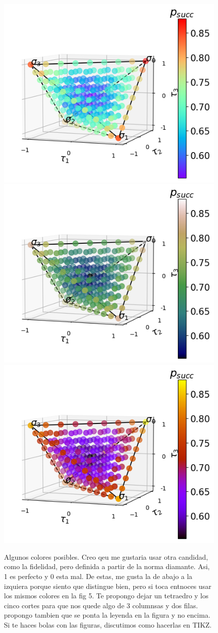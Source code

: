 \documentclass[10pt,letterpaper]{article} %
\begin{document}
\begin{figure}
\includegraphics[width=.32\columnwidth]{images/tetra-col13.png}
\includegraphics[width=.32\columnwidth]{images/tetra-col14.png}
\includegraphics[width=.32\columnwidth]{images/tetra-col16.png}\\[1ex]
\caption{Algunos colores posibles. Creo qeu me gustaria usar otra candidad, 
como la fidelidad, pero definida a partir de la norma diamante. 
Asi, 1 es perfecto y 0 esta mal. De estas, me gusta la de abajo 
a la izquiera porque siento que distingue bien, pero si toca entnoces
usar los mismos colores en la fig 5. Te propongo dejar un tetraedro y los
cinco cortes para que nos quede algo de 3 columnsas y dos filas. 
propongo tambien que se ponta la leyenda en la figura y no encima. 
Si te haces bolas con las figuras, discutimos como hacerlas en TIKZ.  }
\end{figure}
\end{document}
